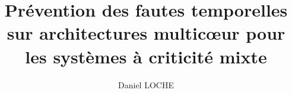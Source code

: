 %
%
%
% 
%


\usepackage[ED=EDSYS-SystEmb, Ets=INP]{tlsflyleaf}

\title{Prévention des fautes temporelles sur architectures multicœur pour les systèmes à criticité mixte}
\author{Daniel LOCHE}

